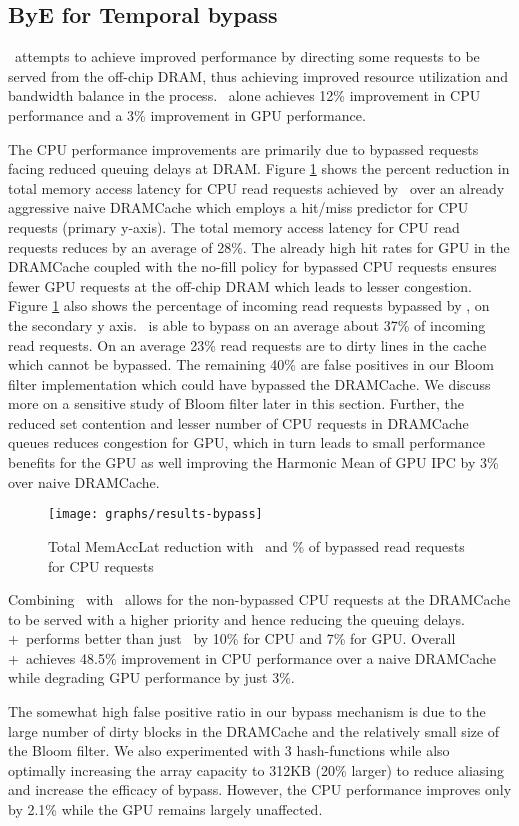 \subsection{ByE for Temporal bypass}
\bypassname\ attempts to achieve improved performance by directing some requests to be served from the off-chip DRAM, thus achieving improved resource utilization and bandwidth balance in the process. \bypassname\ alone achieves 12\% improvement in CPU performance and a 3\% improvement in GPU performance. 
\par The CPU performance improvements are primarily due to bypassed requests facing reduced queuing delays at DRAM. Figure \ref{results-bloom} shows the percent reduction in total memory access latency for CPU read requests achieved by \bypassname\ over an already aggressive naive DRAMCache which employs a hit/miss predictor for CPU requests (primary y-axis). The total memory access latency for CPU read requests reduces by an average of 28\%. The already high hit rates for GPU in the DRAMCache coupled with the no-fill policy for bypassed CPU requests ensures fewer GPU requests at the off-chip DRAM which leads to lesser congestion. Figure \ref{results-bloom} also shows the percentage of incoming read requests bypassed by \bypassname, on the secondary y axis. 
\bypassname\ is able to bypass on an average about 37\% of incoming read requests. On an average 23\% read requests are to dirty lines in the cache which cannot be bypassed.  The remaining 40\% are false positives in our Bloom filter implementation which could have bypassed the DRAMCache. We discuss more on a sensitive study of Bloom filter later in this section. Further, the reduced set contention and lesser number of CPU requests in DRAMCache queues reduces congestion for GPU, which in turn leads to small performance benefits for the GPU as well improving the Harmonic Mean of GPU IPC by 3\% over naive DRAMCache.

\begin{figure}[!htb]
    \centering
    \texttt{[image: graphs/results-bypass]}
    \caption{Total MemAccLat reduction with \bypassname\ and \% of bypassed read requests for CPU requests}
    \label{results-bloom}
\end{figure}

\par Combining \prioname\ with \bypassname\ allows for the non-bypassed CPU requests at the DRAMCache to be served with a higher priority and hence reducing the queuing delays. \bypassname+\prioname\ performs better than just \prioname\ by 10\% for CPU and 7\% for GPU. Overall \bypassname+\prioname\ achieves 48.5\% improvement in CPU performance over a naive DRAMCache while degrading GPU performance by just 3\%.
\par The somewhat high false positive ratio in our bypass mechanism is due to the large number of dirty blocks in the DRAMCache and the relatively small size of the Bloom filter.  We also experimented with 3 hash-functions while also optimally increasing the array capacity to 312KB (20\% larger) to reduce aliasing and increase the efficacy of bypass. However, the CPU performance improves only by 2.1\% while the GPU remains largely unaffected.

